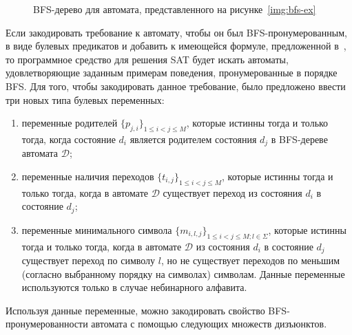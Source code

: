 \begin{figure}[ht]
  \centering
  \ifafour
    
  \else
    
  \fi
  \caption{BFS-дерево для автомата, представленного на рисунке~\ref{img:bfs-ex}}
  \label{img:bfs-tree-ex}
\end{figure}

Если закодировать требование к автомату, чтобы он был BFS-пронумерованным, в виде булевых предикатов и добавить к имеющейся формуле, предложенной в~\cite{heule-icgi10}, то программное средство для решения SAT будет искать автоматы, удовлетворяющие заданным примерам поведения, пронумерованные в порядке BFS.
Для того, чтобы закодировать данное требование, было предложено ввести три новых типа булевых переменных:

\begin{enumerate}
  \item переменные родителей $\{p_{j,i}\}_{1 \leq i < j \leq M}$, которые истинны тогда и только тогда, когда состояние $d_i$ является родителем состояния $d_j$ в BFS-дереве автомата $\mathcal{D}$;
  \item переменные наличия переходов $\{t_{i,j}\}_{1 \leq i < j \leq M}$, которые истинны тогда и только тогда, когда в автомате $\mathcal{D}$ существует переход из состояния $d_{i}$ в состояние $d_{j}$;
  \item переменные минимального символа $\{m_{i,l,j}\}_{1 \leq i < j \leq M;l \in \Sigma}$, которые истинны тогда и только тогда, когда в автомате $\mathcal{D}$ из состояния $d_{i}$ в состояние $d_{j}$ существует переход по символу $l$, но не существует переходов по меньшим (согласно выбранному порядку на символах) символам.
  Данные переменные используются только в случае небинарного алфавита.
\end{enumerate}

Используя данные переменные, можно закодировать свойство BFS-пронумерованности автомата с помощью следующих множеств дизъюнктов.


